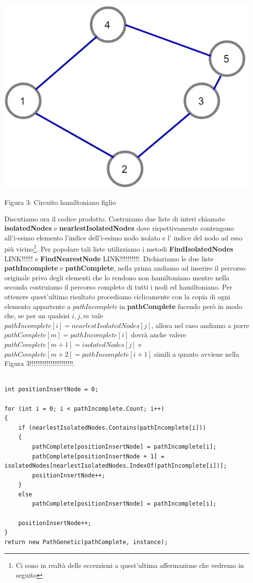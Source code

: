 \documentclass[11pt]{article}
\begin{document}
\begin{center}
\includegraphics[scale=0.5]{circuitoC}

Figura 3: Circuito hamiltoniano figlio
\end{center}

Discutiamo ora il codice prodotto. Costruiamo due liste di interi chiamate \textbf{isolatedNodes} e \textbf{nearlestIsolatedNodes} dove rispettivamente contengono all'i-esimo elemento l'indice dell'i-esimo nodo isolato e l' indice del nodo ad esso più vicino\footnote{Ci sono in realtà delle eccezzioni a quest'ultima affermazione che vedremo in seguito}.
Per popolare tali liste utilizziamo i metodi \textbf{FindIsolatedNodes} LINK!!!!!! e \textbf{FindNearestNode} LINK!!!!!!!!!!.
Dichiariamo le due liste \textbf{pathIncomplete} e \textbf{pathComplete}, nella prima andiamo ad inserire il percorso originale privo degli elementi che lo rendono non hamiltoniano mentre nella seconda costruiamo il percorso completo di tutti i nodi ed hamiltoniano. Per ottenere quest'ultimo risultato procediamo ciclicamente con la copia di ogni elemento appartente a \textit{pathIncomplete} in \textbf{pathComplete} facendo però in modo che, se per un qualsisi $i, j, m$ vale $pathIncomplete[i]=nearlestIsolatedNodes[j]$, allora nel caso andiamo a porre $pathComplete[m]=pathIncomplete[i]$ dovrà anche valere $pathComplete[m+1]=isolatedNodes[j]$ e $pathComplete[m+2]=pathIncomplete[i+1]$ simili a quanto avviene nella Figura 3!!!!!!!!!!!!!!!!!!!!!!!.

\begin{lstlisting}

int positionInsertNode = 0;

for (int i = 0; i < pathIncomplete.Count; i++)
{
    if (nearlestIsolatedNodes.Contains(pathIncomplete[i]))
    {
        pathComplete[positionInsertNode] = pathIncomplete[i];
        pathComplete[positionInsertNode + 1] = isolatedNodes[nearlestIsolatedNodes.IndexOf(pathIncomplete[i])];
        positionInsertNode++;
    }
    else
        pathComplete[positionInsertNode] = pathIncomplete[i];

    positionInsertNode++;
}
return new PathGenetic(pathComplete, instance);
\end{lstlisting}
\end{document}
